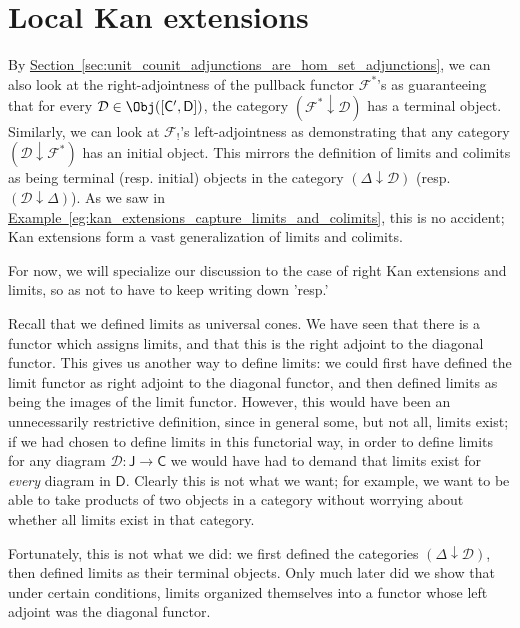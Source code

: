 \documentclass[notes.tex]{subfiles}
\begin{document}
\section{Local Kan extensions}
\label{sec:local_kan_extensions}

By \hyperref[sec:unit_counit_adjunctions_are_hom_set_adjunctions]{Section~\ref*{sec:unit_counit_adjunctions_are_hom_set_adjunctions}}, we can also look at the right-adjointness of the pullback functor $\mathcal{F}^{*}$'s as guaranteeing that for every $\mathcal{D} \in \Obj([\mathsf{C}', \mathsf{D}])$, the category $(\mathcal{F}^{*} \downarrow \mathcal{D})$ has a terminal object. Similarly, we can look at $\mathcal{F}_{!}$'s left-adjointness as demonstrating that any category $(\mathcal{D} \downarrow \mathcal{F}^{*})$ has an initial object. This mirrors the definition of limits and colimits as being terminal (resp. initial) objects in the category $(\Delta \downarrow \mathcal{D})$ (resp. $(\mathcal{D} \downarrow \Delta)$). As we saw in \hyperref[eg:kan_extensions_capture_limits_and_colimits]{Example~\ref*{eg:kan_extensions_capture_limits_and_colimits}}, this is no accident; Kan extensions form a vast generalization of limits and colimits.

For now, we will specialize our discussion to the case of right Kan extensions and limits, so as not to have to keep writing down 'resp.'

Recall that we defined limits as universal cones. We have seen that there is a functor which assigns limits, and that this is the right adjoint to the diagonal functor. This gives us another way to define limits: we could first have defined the limit functor as right adjoint to the diagonal functor, and then defined limits as being the images of the limit functor. However, this would have been an unnecessarily restrictive definition, since in general some, but not all, limits exist; if we had chosen to define limits in this functorial way, in order to define limits for any diagram $\mathcal{D}\colon \mathsf{J} \to \mathsf{C}$ we would have had to demand that limits exist for \emph{every} diagram in $\mathsf{D}$. Clearly this is not what we want; for example, we want to be able to take products of two objects in a category without worrying about whether all limits exist in that category.

Fortunately, this is not what we did: we first defined the categories $(\Delta \downarrow \mathcal{D})$, then defined limits as their terminal objects. Only much later did we show that under certain conditions, limits organized themselves into a functor whose left adjoint was the diagonal functor.
\end{document}
